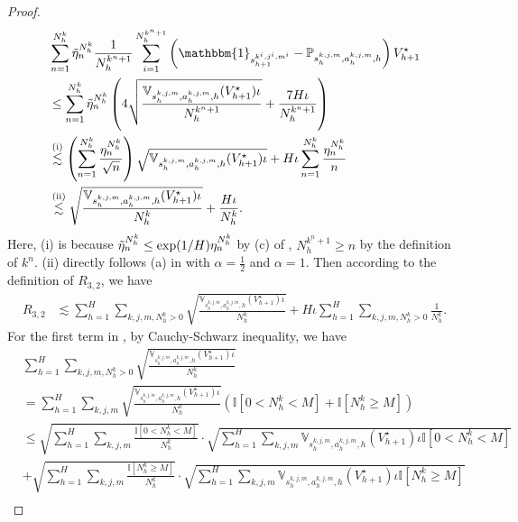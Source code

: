 \documentclass{article}
\begin{document}
\begin{proof}
\begin{align}
    \label{singleupperr32begin}
    &\sum_{n=1}^{N_h^k} \Tilde{\eta}_n^{N_h^k}\frac{1}{N_h^{k^n+1}} \sum_{i=1}^{N_h^{k^n+1}}\left(\mathbbm{1}_{s_{h+1}^{k^i,j^i,m^i}}-\mathbb{P}_{s_h^{k,j,m}, a_h^{k,j,m},h}\right)V_{h+1}^{\star} \nonumber\\
    &\leq \sum_{n=1}^{N_h^k} \Tilde{\eta}_n^{N_h^k}\left(4\sqrt{\frac{\mathbb{V}_{s_h^{k,j,m}, a_h^{k,j,m},h}(V_{h+1}^{\star})\iota}{N_h^{k^n+1}}}+\frac{7H\iota}{N_h^{k^n+1}}\right) \nonumber\\
    &\overset{\mathrm{(i)}}{\lesssim} \left(\sum_{n=1}^{N_h^k} \frac{\eta_n^{N_h^k}}{\sqrt{n}}\right)\sqrt{\mathbb{V}_{s_h^{k,j,m}, a_h^{k,j,m},h}(V_{h+1}^{\star})\iota} + H\iota\sum_{n=1}^{N_h^k} \frac{\eta_n^{N_h^k}}{n}\nonumber\\
    &\overset{\mathrm{(ii)}}{\lesssim} \sqrt{\frac{\mathbb{V}_{s_h^{k,j,m}, a_h^{k,j,m},h}(V_{h+1}^{\star})\iota}{N_h^k}} + \frac{H\iota}{N_h^k}.
\end{align}
Here, (i) is because $\Tilde{\eta}_n^{N_h^k} \leq \exp(1/H)\eta_n^{N_h^k}$ by (c) of , $N_h^{k^n+1} \geq n$ by the definition of $k^n$. (ii) directly follows (a) in  with $\alpha = \frac{1}{2}$ and $\alpha = 1$. Then according to the definition of $R_{3,2}$, we have
\begin{align}
    \label{upperr32begin}
    R_{3,2} 
    &\lesssim \sum_{h=1}^H \sum_{k,j,m,N_h^k >0} \sqrt{\frac{\mathbb{V}_{s_h^{k,j,m}, a_h^{k,j,m},h}(V_{h+1}^{\star})\iota}{N_h^k}} + H\iota\sum_{h=1}^H \sum_{k,j,m,N_h^k >0}\frac{1}{N_h^k}.
\end{align}
 For the first term in , by Cauchy-Schwarz inequality, we have
\begin{align}
    \label{r321begin1}
    &\sum_{h=1}^H \sum_{k,j,m,N_h^k >0} \sqrt{\frac{\mathbb{V}_{s_h^{k,j,m}, a_h^{k,j,m},h}(V_{h+1}^{\star})\iota}{N_h^k}} \nonumber\\
    &= \sum_{h=1}^H \sum_{k,j,m}\sqrt{\frac{\mathbb{V}_{s_h^{k,j,m}, a_h^{k,j,m},h}(V_{h+1}^{\star})\iota}{N_h^k}}\left(\mathbb{I}\left[0<N_h^k< M\right]+\mathbb{I}\left[N_h^k\geq M\right]\right) \nonumber\\
    &\leq \sqrt{\sum_{h=1}^H\sum_{k,j,m}\frac{\mathbb{I}\left[0<N_h^k< M\right]}{N_h^k}}\cdot \sqrt{\sum_{h=1}^H \sum_{k,j,m}\mathbb{V}_{s_h^{k,j,m}, a_h^{k,j,m},h}(V_{h+1}^{\star})\iota\mathbb{I}\left[0<N_h^k< M\right]} \nonumber\\
    & +\sqrt{\sum_{h=1}^H\sum_{k,j,m}\frac{\mathbb{I}\left[N_h^k\geq M\right]}{N_h^k}}\cdot \sqrt{\sum_{h=1}^H \sum_{k,j,m}\mathbb{V}_{s_h^{k,j,m}, a_h^{k,j,m},h}(V_{h+1}^{\star})\iota\mathbb{I}\left[N_h^k\geq M\right]} \nonumber\\

\end{align}
\end{proof}
\end{document}
